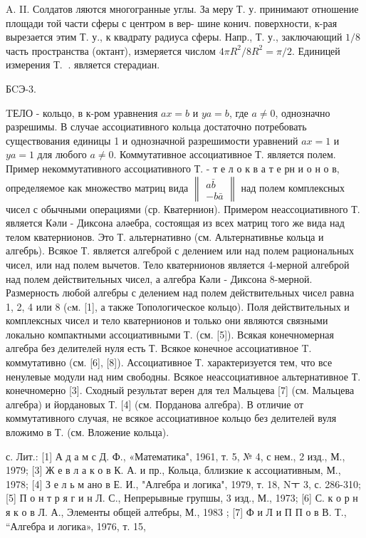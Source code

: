 \documentclass[10pt]{article}
\begin{document}
A. II. Солдатов ляются многогранные углы. За меру Т. у. принимают отношение площади той части сферы с центром в вер- шине конич. поверхности, к-рая вырезается этим Т. у., к квадрату радиуса сферы. Напр., Т. у., заключающий $1 / 8$ часть пространства (октант), измеряется числом $4 \pi R^{2} / 8 R^{2}=\pi / 2$. Единицей измерения Т. $\mathbf{~}$. является стерадиан.



БCЭ-3.



TЕЛО - кольцо, в к-ром уравнения $a x=b$ и $y a=b$, где $a \neq 0$, однозначно разрешимы. В случае ассоциативного кольца достаточно потребовать существования единицы 1 и однозначной разрешимости уравнений $a x=1$ и $y a=1$ для любого $a \neq 0$. Коммутативное ассоциативное Т. является полем. Пример некоммутативного ассоциативного Т. - т е л о к в а т е рн и о н о в, определяемое как множество матриц вида $\left\|\begin{array}{r}a \bar{b} \\ -b \bar{a}\end{array}\right\|$ над полем комплексных чисел с обычными операциями (ср. Кватернион). Примером неассоциативного Т. является Кәли - Диксона аләебра, состоящая из всех матриц того же вида над телом кватернионов. Это Т. альтернативно (см. Альтернативнье кольца и алгебрь). Всякое Т. является алгеброй с делением или над полем рациональных чисел, или над полем вычетов. Тело кватернионов является 4-мерной алгеброй над полем действительных чисел, а алгебра Кәли - Диксона 8-мерной. Размерность любой алгебры с делением над полем действительных чисел равна 1, 2, 4 или 8 (cм. [1], а также Топологическое кольцо). Поля действительных и комплексных чисел и тело кватернионов и только они являются связными локально компактными ассоциативными Т. (см. [5]). Всякая конечномерная алгебра без делителей нуля есть Т. Всякое конечное ассоциативное T. коммутативно (см. [6], [8]). Ассоциативное Т. характеризуется тем, что все ненулевые модули над ним свободны. Всякое неассоциативное альтернативное Т. конечномерно [3]. Сходный результат верен для тел Мальцева [7] (см. Мальцева алгебра) и йордановых Т. [4] (см. Порданова алгебра). В отличие от коммутативного случая, не всякое ассоциативное кольцо без делителей вуля вложимо в Т. (см. Вложение кольца).



с. Лит.: [1] А д а м с Д. Ф., «Математика", 1961, т. 5, № 4, с нем., 2 изд., М., 1979; [3] Ж е в л а к о в К. А. и пр., Кольца, бллизкие к ассоциативным, М., 1978; [4] З е л ь м ано в Е. И., "Алгебра и логика", 1979, т. 18, Nㅜ 3, с. 286-310; [5] П о н т р я г и н Л. С., Непрерывные групшы, 3 изд., М., 1973; [6] С. к о р н я к о в Л. А., Элементы общей алтебры, М., 1983 ; [7] Ф и Л и П П о в В. Т., “Алгебра и логика», 1976, т. 15,
\end{document}

